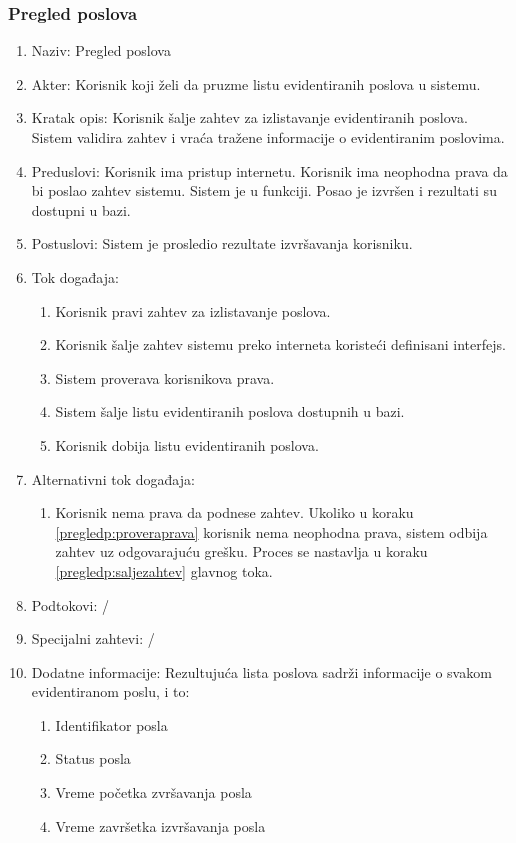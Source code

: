 \documentclass[12pt,oneside]{memoir}
\begin{document}
\subsubsection{Pregled poslova}
\begin{enumerate}
\item Naziv: Pregled poslova
\item Akter: Korisnik koji želi da pruzme listu evidentiranih poslova u sistemu.
\item Kratak opis: Korisnik šalje zahtev za izlistavanje evidentiranih poslova. Sistem validira zahtev i vraća tražene informacije o evidentiranim poslovima.
\item Preduslovi: Korisnik ima pristup internetu. Korisnik ima neophodna prava da bi poslao zahtev sistemu. Sistem je u funkciji. Posao je izvršen i rezultati su dostupni u bazi.
\item Postuslovi: Sistem je prosledio rezultate izvršavanja korisniku.
\item Tok događaja:
	\begin{enumerate}
	\item \label{pregledp:konstruisezahtev} Korisnik pravi zahtev za izlistavanje poslova.
	\item \label{pregledp:saljezahtev} Korisnik šalje zahtev sistemu preko interneta koristeći definisani interfejs.
	\item \label{pregledp:proveraprava} Sistem proverava korisnikova prava.
	\item \label{pregledp:slanjeliste} Sistem šalje listu evidentiranih poslova dostupnih u bazi.
	\item Korisnik dobija listu evidentiranih poslova.
	\end{enumerate}
\item Alternativni tok događaja:
	\begin{enumerate}
	\item Korisnik nema prava da podnese zahtev. Ukoliko u koraku \ref{pregledp:proveraprava} korisnik nema neophodna prava, sistem odbija zahtev uz odgovarajuću grešku. Proces se nastavlja u koraku \ref{pregledp:saljezahtev} glavnog toka.
	\end{enumerate}
\item Podtokovi: /
\item Specijalni zahtevi: /
\item Dodatne informacije: Rezultujuća lista poslova sadrži informacije o svakom evidentiranom poslu, i to:
	\begin{enumerate}
	\item Identifikator posla
	\item Status posla
	\item Vreme početka zvršavanja posla
	\item Vreme završetka izvršavanja posla
	\end{enumerate}
\end{enumerate}
\end{document}

